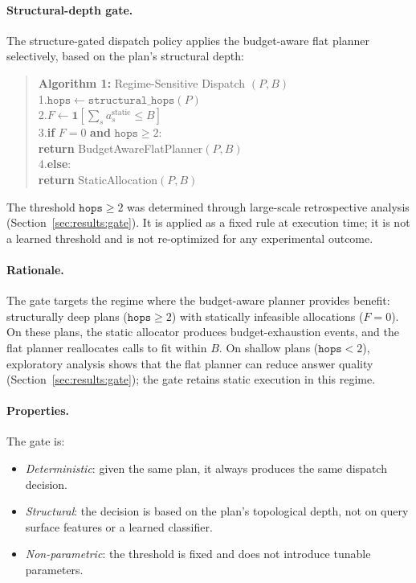 \paragraph{Structural-depth gate.}
The structure-gated dispatch policy applies the budget-aware flat planner selectively, based on the plan's structural depth:

\begin{quote}
\small
\textbf{Algorithm 1:} Regime-Sensitive Dispatch $(P, B)$\\
1.\quad $\texttt{hops} \leftarrow \texttt{structural\_hops}(P)$\\
2.\quad $F \leftarrow \mathbf{1}[\sum_{s} a^{\text{static}}_s \leq B]$\\
3.\quad \textbf{if} $F = 0$ \textbf{and} $\texttt{hops} \geq 2$:\\
\quad\quad \textbf{return} BudgetAwareFlatPlanner$(P, B)$\\
4.\quad \textbf{else}:\\
\quad\quad \textbf{return} StaticAllocation$(P, B)$
\end{quote}

\noindent The threshold $\texttt{hops} \geq 2$ was determined through large-scale retrospective analysis (Section~\ref{sec:results:gate}). It is applied as a fixed rule at execution time; it is not a learned threshold and is not re-optimized for any experimental outcome.

\paragraph{Rationale.}
The gate targets the regime where the budget-aware planner provides benefit: structurally deep plans ($\texttt{hops} \geq 2$) with statically infeasible allocations ($F = 0$). On these plans, the static allocator produces budget-exhaustion events, and the flat planner reallocates calls to fit within $B$. On shallow plans ($\texttt{hops} < 2$), exploratory analysis shows that the flat planner can reduce answer quality (Section~\ref{sec:results:gate}); the gate retains static execution in this regime.

\paragraph{Properties.}
The gate is:
\begin{itemize}
\item \emph{Deterministic}: given the same plan, it always produces the same dispatch decision.
\item \emph{Structural}: the decision is based on the plan's topological depth, not on query surface features or a learned classifier.
\item \emph{Non-parametric}: the threshold is fixed and does not introduce tunable parameters.
\end{itemize}

